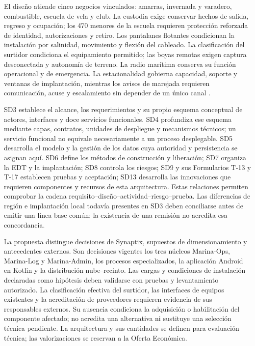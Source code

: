 El diseño atiende cinco negocios vinculados: amarras, invernada y varadero, combustible, escuela de vela y club. La custodia exige conservar hechos de salida, regreso y ocupación; los 470 menores de la escuela requieren protección reforzada de identidad, autorizaciones y retiro. Los pantalanes flotantes condicionan la instalación por salinidad, movimiento y flexión del cableado. La clasificación del surtidor condiciona el equipamiento permitido; las boyas remotas exigen captura desconectada y autonomía de terreno. La radio marítima conserva su función operacional y de emergencia. La estacionalidad gobierna capacidad, soporte y ventanas de implantación, mientras los avisos de marejada requieren comunicación, acuse y escalamiento sin depender de un único canal \parencite[caps.~2--4, 10, 14--15]{caso07}.

SD3 establece el alcance, los requerimientos y su propio esquema conceptual de actores, interfaces y doce servicios funcionales. SD4 profundiza ese esquema mediante capas, contratos, unidades de despliegue y mecanismos técnicos; un servicio funcional no equivale necesariamente a un proceso desplegable. SD5 desarrolla el modelo y la gestión de los datos cuya autoridad y persistencia se asignan aquí. SD6 define los métodos de construcción y liberación; SD7 organiza la EDT y la implantación; SD8 controla los riesgos; SD9 y sus Formularios T-13 y T-17 establecen pruebas y aceptación; SD13 desarrolla las innovaciones que requieren componentes y recursos de esta arquitectura. Estas relaciones permiten comprobar la cadena requisito--diseño--actividad--riesgo--prueba. Las diferencias de región e implantación local todavía presentes en SD3 deben conciliarse antes de emitir una línea base común; la existencia de una remisión no acredita esa concordancia.

La propuesta distingue decisiones de Synaptix, supuestos de dimensionamiento y antecedentes externos. Son decisiones vigentes los tres núcleos Marina-Ops, Marina-Log y Marina-Admin, los procesos especializados, la aplicación Android en Kotlin y la distribución nube--recinto. Las cargas y condiciones de instalación declaradas como hipótesis deben validarse con pruebas y levantamiento autorizado. La clasificación efectiva del surtidor, las interfaces de equipos existentes y la acreditación de proveedores requieren evidencia de sus responsables externos. Su ausencia condiciona la adquisición o habilitación del componente afectado; no acredita una alternativa ni sustituye una selección técnica pendiente. La arquitectura y sus cantidades se definen para evaluación técnica; las valorizaciones se reservan a la Oferta Económica.

